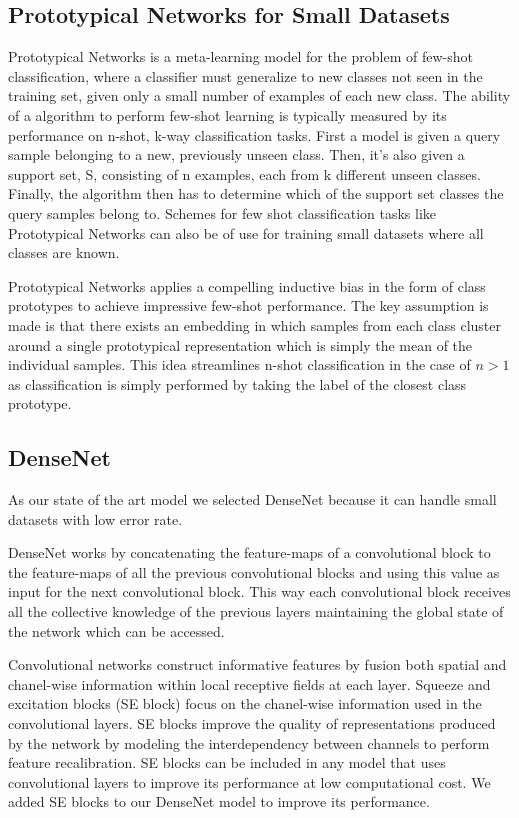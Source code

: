 \subsection{Prototypical Networks for Small Datasets}
\label{models:protonet}

Prototypical Networks \cite{protonet} is a meta-learning model for the problem of few-shot classification, where a classifier must generalize to new classes not seen in the training set, given only a small number of examples of each new class. The ability of a algorithm to perform few-shot learning is typically measured by its performance on n-shot, k-way classification tasks. First a model is given a query sample belonging to a new, previously unseen class. Then, it’s also given a support set, S, consisting of n examples, each from k different unseen classes. Finally, the algorithm then has to determine which of the support set classes the query samples belong to.
Schemes for few shot classification tasks like Prototypical Networks can also be of use for training small datasets where all classes are known.

Prototypical Networks applies a compelling inductive bias in the form of class prototypes to achieve impressive few-shot performance. The key assumption is made is that there exists an embedding in which samples from each class cluster around a single prototypical representation which is simply the mean of the individual samples. This idea streamlines n-shot classification in the case of $n > 1$ as classification is simply performed by taking the label of the closest class prototype.

\subsection{DenseNet}

As our state of the art model we selected DenseNet because it can handle small datasets with low error rate\cite{pmlr-v80-pham18a}.

DenseNet \cite{densenet} works by concatenating the feature-maps of a convolutional block to the feature-maps of all the previous convolutional blocks and using this value as input for the next convolutional block. This way each convolutional block receives all the collective knowledge of the previous layers maintaining the global state of the network which can be accessed.

Convolutional networks construct informative features by fusion both spatial and chanel-wise information within local receptive fields at each layer. Squeeze and excitation blocks (SE block) \cite{Hu2017SqueezeandExcitationN} focus on the chanel-wise information used in the convolutional layers. SE blocks improve the quality of representations produced by the network by modeling the interdependency between channels to perform feature recalibration. SE blocks can be included in any model that uses convolutional layers to improve its performance at low computational cost. We added SE blocks to our DenseNet model to improve its performance.

